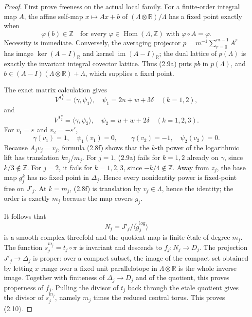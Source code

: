 \begin{proof}
First prove freeness on the actual local family.  For a finite-order
integral map \(A\), the affine self-map \(x\mapsto Ax+b\) of
\((\Lambda\otimes\mathbb R)/\Lambda\) has a fixed point exactly when
\[
 \varphi(b)\in\mathbb Z
 \quad\text{for every }\varphi\in\operatorname{Hom}(\Lambda,\mathbb Z)
 \text{ with }\varphi\circ A=\varphi.
 \tag{2.9a}
\]
Necessity is immediate.  Conversely, the averaging projector
\(p=m^{-1}\sum_{r=0}^{m-1}A^r\) has image \(\ker(A-I)_{\mathbb R}\) and
kernel \(\operatorname{im}(A-I)_{\mathbb R}\); the dual lattice of
\(p(\Lambda)\) is exactly the invariant integral covector lattice.  Thus
(2.9a) puts \(pb\) in \(p(\Lambda)\), and
\(b\in(A-I)(\Lambda\otimes\mathbb R)+\Lambda\), which supplies a fixed
point.

The exact matrix calculation gives
\[
 V^{T_1^k}=\langle\gamma,\psi_1\rangle,
 \quad \psi_1=2u+w+3\delta \quad(k=1,2),
\]
and
\[
 V^{T_2^k}=\langle\gamma,\psi_2\rangle,
 \quad \psi_2=u+w+2\delta \quad(k=1,2,3).
 \tag{2.9b}
\]
For \(v_1=\varepsilon\) and \(v_2=-\varepsilon'\),
\[
 \gamma(v_1)=1,\quad\psi_1(v_1)=0,
 \qquad
 \gamma(v_2)=-1,\quad\psi_2(v_2)=0.
 \tag{2.9c}
\]
Because \(A_jv_j=v_j\), formula (2.8f) shows that the \(k\)-th power of
the logarithmic lift has translation \(kv_j/m_j\).  For \(j=1\), (2.9a)
fails for \(k=1,2\) already on \(\gamma\), since \(k/3\notin\mathbb Z\).
For \(j=2\), it fails for \(k=1,2,3\), since \(-k/4\notin\mathbb Z\).
Away from \(z_j\), the base map \(g_j^k\) has no fixed point in
\(\Delta_j\).  Hence every nonidentity power is fixed-point free on
\(J'_j\).  At \(k=m_j\), (2.8f) is translation by
\(v_j\in\Lambda\), hence the identity; the order is exactly \(m_j\)
because the map covers \(g_j\).

It follows that
\[
 N_j=J'_j/\langle\widetilde g_j^{\log}\rangle
\]
is a smooth complex threefold and the quotient map is finite \'etale of
degree \(m_j\).  The function \(s_j^{m_j}=t_j\circ\pi\) is invariant and
descends to \(f_j:N_j\to D_j\).  The projection
\(J'_j\to\Delta_j\) is proper: over a compact subset, the image of the
compact set obtained by letting \(x\) range over a fixed unit
parallelotope in \(\Lambda\otimes\mathbb R\) is the whole inverse image.
Together with finiteness of \(\Delta_j\to D_j\) and of the quotient, this
proves properness of \(f_j\).  Pulling the divisor of \(t_j\) back through
the etale quotient gives the divisor of \(s_j^{m_j}\), namely \(m_j\)
times the reduced central torus.  This proves (2.10).


\end{proof}
